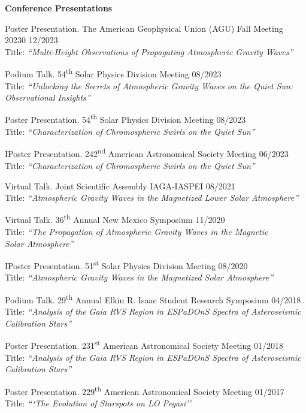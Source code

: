 \documentclass{resume} %
\begin{document}
\vspace{-0.1in}
\begin{rSection}{\textbf{Conference Presentations}}
\vspace{0.02in}

{Poster Presentation. The American Geophysical Union (AGU) Fall Meeting 20230 \hfill{12/2023} \\  Title: \emph{``Multi-Height Observations of Propagating Atmospheric Gravity Waves''}}

{Podium Talk. 54\textsuperscript{th} Solar Physics Division Meeting \hfill{08/2023} \\ Title: \emph{``Unlocking the Secrets of Atmospheric Gravity Waves on the Quiet Sun: \\ Observational Insights''}}

{Poster Presentation. 54\textsuperscript{th} Solar Physics Division Meeting \hfill{08/2023} \\  Title: \emph{``Characterization of Chromospheric Swirls on the Quiet Sun''}}

{IPoster Presentation. 242\textsuperscript{nd} American Astronomical Society  Meeting \hfill{06/2023} \\ Title: \emph{``Characterization of Chromospheric Swirls on the Quiet Sun''}}

{Virtual Talk. Joint Scientific Assembly IAGA-IASPEI \hfill{08/2021} \\ Title: \emph{``Atmospheric Gravity Waves in the Magnetized Lower Solar Atmosphere''}} 

{Virtual Talk. 36\textsuperscript{th} Annual New Mexico Symposium \hfill{11/2020} \\ Title: \emph{``The Propagation of Atmospheric Gravity Waves in the Magnetic \\ Solar Atmosphere''}}

{IPoster Presentation. 51\textsuperscript{st} Solar Physics Division Meeting \hfill{08/2020} \\ Title: \emph{``Atmospheric Gravity Waves in the Magnetized Solar Atmosphere''}}


{Podium Talk. 29\textsuperscript{th} Annual Elkin R. Isaac Student Research Symposium \hfill{04/2018} \\ Title: \emph{``Analysis of the Gaia RVS Region in ESPaDOnS Spectra of Asteroseismic \\ Calibration Stars''}}

{Poster Presentation. 231\textsuperscript{st} American Astronomical Society Meeting \hfill{01/2018} \\ Title: \emph{``Analysis of the Gaia RVS Region in ESPaDOnS Spectra of Asteroseismic  \\ Calibration
Stars''}} 

{Poster Presentation. 229\textsuperscript{th} American Astronomical Society Meeting \hfill{01/2017} \\ Title: \emph{```The Evolution of Starspots on LO Pegasi''}}
\end{rSection}
\end{document}
